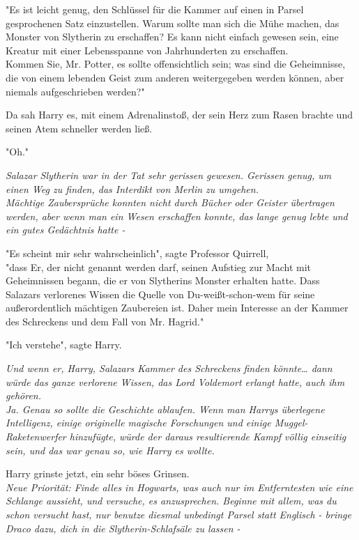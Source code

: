 {"Es ist leicht genug, den Schlüssel für die Kammer auf einen in Parsel gesprochenen Satz einzustellen. Warum sollte man sich die Mühe machen, das Monster von Slytherin zu erschaffen? Es kann nicht einfach gewesen sein, eine Kreatur mit einer Lebensspanne von Jahrhunderten zu erschaffen.\\ Kommen Sie, Mr. Potter, es sollte offensichtlich sein; was sind die Geheimnisse, die von einem lebenden Geist zum anderen weitergegeben werden können, aber niemals aufgeschrieben werden?"

Da sah Harry es, mit einem Adrenalinstoß, der sein Herz zum Rasen brachte und seinen Atem schneller werden ließ.

"Oh."

\emph{Salazar Slytherin war in der Tat sehr gerissen gewesen. Gerissen genug, um einen Weg zu finden, das Interdikt von Merlin zu umgehen.}\\ \emph{Mächtige Zaubersprüche konnten nicht durch Bücher oder Geister übertragen werden, aber wenn man ein Wesen erschaffen konnte, das lange genug lebte und ein gutes Gedächtnis hatte -}

"Es scheint mir sehr wahrscheinlich", sagte Professor Quirrell,\\ "dass Er, der nicht genannt werden darf, seinen Aufstieg zur Macht mit Geheimnissen begann, die er von Slytherins Monster erhalten hatte. Dass Salazars verlorenes Wissen die Quelle von Du-weißt-schon-wem für seine außerordentlich mächtigen Zaubereien ist. Daher mein Interesse an der Kammer des Schreckens und dem Fall von Mr. Hagrid."

"Ich verstehe", sagte Harry.

\emph{Und wenn er, Harry, Salazars Kammer des Schreckens finden könnte… dann würde das ganze verlorene Wissen, das Lord Voldemort erlangt hatte, auch ihm gehören.\\ Ja. Genau so sollte die Geschichte ablaufen. Wenn man Harrys überlegene Intelligenz, einige originelle magische Forschungen und einige Muggel-Raketenwerfer hinzufügte, würde der daraus resultierende Kampf völlig einseitig sein, und das war genau so, wie Harry es wollte.}

Harry grinste jetzt, ein sehr böses Grinsen.\\ \emph{Neue Priorität: Finde alles in Hogwarts, was auch nur im Entferntesten wie eine Schlange aussieht, und versuche, es anzusprechen. Beginne mit allem, was du schon versucht hast, nur benutze diesmal unbedingt Parsel statt Englisch - bringe Draco dazu, dich in die Slytherin-Schlafsäle zu lassen -}

}

